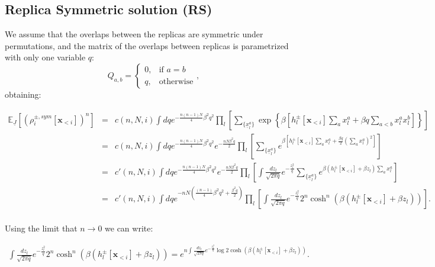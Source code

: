 \documentclass[10pt, notitlepage]{revtex4-2}
\begin{document}
\subsection{Replica Symmetric solution (RS)}
\label{sec:RS}
We assume that the overlaps between the replicas are symmetric under permutations, and the matrix of the overlaps between replicas is parametrized with only one variable $q$:
$$
Q_{a,b}=\begin{cases}
			0, & \text{if $a=b$}\\
            q, & \text{otherwise}
		 \end{cases},
$$
obtaining:
\begin{widetext}
\begin{eqnarray}
\mathbb{E}_{\underline{J}}\left[(\rho_i^{\pm, sym}[\mathbf{x}_{<i}])^n \right] & = & 
c(n,N,i)
\int dq e^{-\frac{n(n-1)N}{4}\beta^2 q^2}
\prod_{l} \left[
\sum_{\{\underline{x}^{a}_l\}} 
\exp\left\{\beta \left[
h_l^{\pm}[\mathbf{x}_{<i}] \sum_{a} x_l^{a} +\beta q \sum_{a<b} x_l^{a} x_l^{b} \right]  \right\} 
\right] \\
& = &
c(n,N,i)
\int dq e^{-\frac{n(n-1)N}{4}\beta^2 q^2}
e^{-\frac{nN\beta^2 q}{2}}
\prod_{l} \left[
\sum_{\{\underline{x}^{a}_l\}} 
e^{\beta \left[
h_l^{\pm}[\mathbf{x}_{<i}] \sum_{a} x_l^{a} + \frac{\beta q}{2} \left(\sum_{a} x_l^{a} \right)^2 \right]} 
\right]\\
& = &
c'(n,N,i)
\int dq e^{-\frac{n(n-1)N}{4}\beta^2 q^2}
e^{-\frac{nN\beta^2 q}{2}}
\prod_{l} \left[\int \frac{dz_l}{\sqrt{2\pi q}} e^{-\frac{z_l^2}{q}}
\sum_{\{\underline{x}^{a}_l\}} 
e^{\beta \left(
h_l^{\pm}[\mathbf{x}_{<i}] +\beta z_l \right) \sum_{a} x_l^{a}} 
\right]\\
& = &
c'(n,N,i)
\int dq e^{-nN\left(\frac{(n-1)}{4}\beta^2 q^2 +\frac{\beta^2 q}{2}\right)}
\prod_{l} \left[\int \frac{dz_l}{\sqrt{2\pi q}} e^{-\frac{z_l^2}{q}}
2^n\cosh^n \left(\beta \left(
h_l^{\pm}[\mathbf{x}_{<i}] +\beta z_l \right)\right) 
\right].\\
\end{eqnarray}
\end{widetext}
Using the limit that $n\rightarrow 0$ we can write:
\begin{widetext}
\begin{eqnarray}
\int \frac{dz_l}{\sqrt{2\pi q}} e^{-\frac{z_l^2}{q}}
2^n\cosh^n \left(\beta \left(
h_l^{\pm}[\mathbf{x}_{<i}] +\beta z_l \right)\right) = e^{n \int \frac{dz_l}{\sqrt{2\pi q}} e^{-\frac{z_l^2}{q}}
\log 2\cosh \left(\beta \left(
h_l^{\pm}[\mathbf{x}_{<i}] +\beta z_l \right)\right)}.
\label{eq:gauss_n0}
\end{eqnarray}
\end{widetext}
\end{document}
